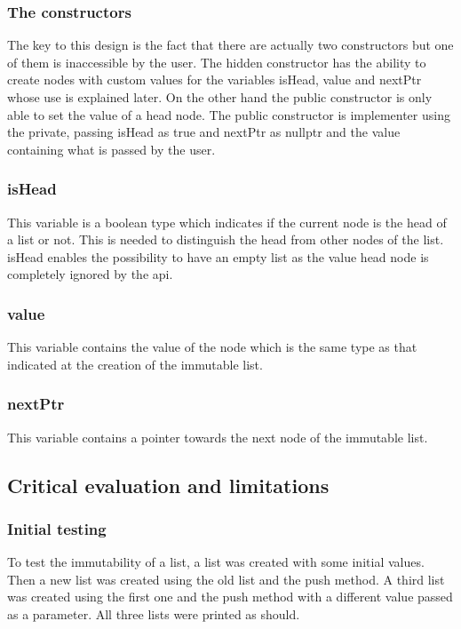 \documentclass[a4paper, 12pt]{report}
\begin{document}
\subsubsection{The constructors}
The key to this design is the fact that there are actually two constructors but one of them is inaccessible by the user. The hidden constructor has the ability to create nodes with custom values for the variables isHead, value and nextPtr whose use is explained later. On the other hand the public constructor is only able to set the value of a head node. The public constructor is implementer using the private, passing isHead as true and nextPtr as nullptr and the value containing what is passed by the user.

\subsubsection{isHead}
This variable is a boolean type which indicates if the current node is the head of a list or not. This is needed to distinguish the head from other nodes of the list.  isHead enables the possibility to have an empty list as the value head node is completely ignored by the api.

\subsubsection{value}
This variable contains the value of the node which is the same type as that indicated at the creation of the immutable list.

\subsubsection{nextPtr}
This variable contains a pointer towards the next node of the immutable list.

\subsection{Critical evaluation and limitations}
\subsubsection{Initial testing}
To test the immutability of a list, a list was created with some initial values. Then a new list was created using the old list and the push method. A third list was created using the first one and the push method with a different value passed as a parameter. All three lists were printed as should.
\end{document}
